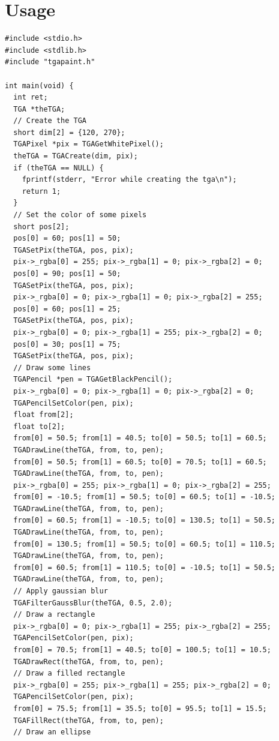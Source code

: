 \documentclass[12pt, a4paper]{article}
\begin{document}
\section{Usage}

\begin{scriptsize}
\begin{ttfamily}
\begin{lstlisting}
#include <stdio.h>
#include <stdlib.h>
#include "tgapaint.h"

int main(void) {
  int ret;
  TGA *theTGA;
  // Create the TGA
  short dim[2] = {120, 270};
  TGAPixel *pix = TGAGetWhitePixel();
  theTGA = TGACreate(dim, pix);
  if (theTGA == NULL) {
    fprintf(stderr, "Error while creating the tga\n");
    return 1;
  }
  // Set the color of some pixels
  short pos[2];
  pos[0] = 60; pos[1] = 50;
  TGASetPix(theTGA, pos, pix);
  pix->_rgba[0] = 255; pix->_rgba[1] = 0; pix->_rgba[2] = 0;
  pos[0] = 90; pos[1] = 50;
  TGASetPix(theTGA, pos, pix);
  pix->_rgba[0] = 0; pix->_rgba[1] = 0; pix->_rgba[2] = 255;
  pos[0] = 60; pos[1] = 25;
  TGASetPix(theTGA, pos, pix);
  pix->_rgba[0] = 0; pix->_rgba[1] = 255; pix->_rgba[2] = 0;
  pos[0] = 30; pos[1] = 75;
  TGASetPix(theTGA, pos, pix);
  // Draw some lines
  TGAPencil *pen = TGAGetBlackPencil();
  pix->_rgba[0] = 0; pix->_rgba[1] = 0; pix->_rgba[2] = 0;
  TGAPencilSetColor(pen, pix);
  float from[2];
  float to[2];
  from[0] = 50.5; from[1] = 40.5; to[0] = 50.5; to[1] = 60.5;
  TGADrawLine(theTGA, from, to, pen);
  from[0] = 50.5; from[1] = 60.5; to[0] = 70.5; to[1] = 60.5;
  TGADrawLine(theTGA, from, to, pen);
  pix->_rgba[0] = 255; pix->_rgba[1] = 0; pix->_rgba[2] = 255;
  from[0] = -10.5; from[1] = 50.5; to[0] = 60.5; to[1] = -10.5;
  TGADrawLine(theTGA, from, to, pen);
  from[0] = 60.5; from[1] = -10.5; to[0] = 130.5; to[1] = 50.5;
  TGADrawLine(theTGA, from, to, pen);
  from[0] = 130.5; from[1] = 50.5; to[0] = 60.5; to[1] = 110.5;
  TGADrawLine(theTGA, from, to, pen);
  from[0] = 60.5; from[1] = 110.5; to[0] = -10.5; to[1] = 50.5;
  TGADrawLine(theTGA, from, to, pen);
  // Apply gaussian blur
  TGAFilterGaussBlur(theTGA, 0.5, 2.0);
  // Draw a rectangle
  pix->_rgba[0] = 0; pix->_rgba[1] = 255; pix->_rgba[2] = 255;
  TGAPencilSetColor(pen, pix);
  from[0] = 70.5; from[1] = 40.5; to[0] = 100.5; to[1] = 10.5;
  TGADrawRect(theTGA, from, to, pen);
  // Draw a filled rectangle
  pix->_rgba[0] = 255; pix->_rgba[1] = 255; pix->_rgba[2] = 0;
  TGAPencilSetColor(pen, pix);
  from[0] = 75.5; from[1] = 35.5; to[0] = 95.5; to[1] = 15.5;
  TGAFillRect(theTGA, from, to, pen);
  // Draw an ellipse

\end{lstlisting}
\end{ttfamily}
\end{scriptsize}
\end{document}
